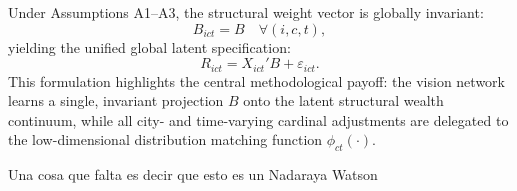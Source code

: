 Under Assumptions A1--A3, the structural weight vector is globally invariant:
\begin{equation}
B_{ict} = B \quad \forall (i,c,t),
\end{equation}
yielding the unified global latent specification:
\begin{equation}
\boxed{
R_{ict} = X_{ict}' B + \varepsilon_{ict}.
}
\label{eq:final_global_latent_model}
\end{equation}
This formulation highlights the central methodological payoff: the vision network learns a single, invariant projection $B$ onto the latent structural wealth continuum, while all city- and time-varying cardinal adjustments are delegated to the low-dimensional distribution matching function $\phi_{ct}(\cdot)$.




Una cosa que falta es decir que esto es un Nadaraya Watson